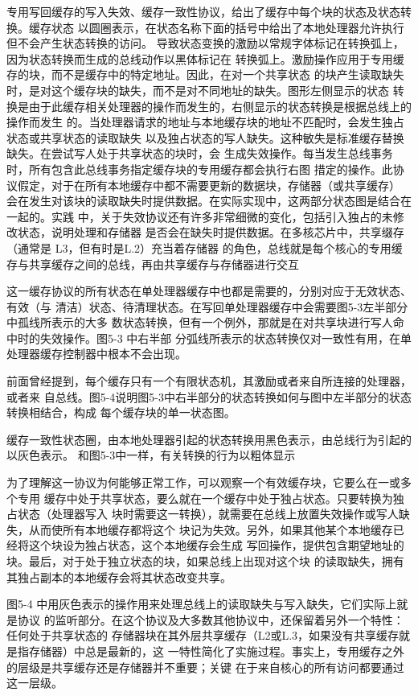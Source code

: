 专用写回缓存的写入失效、缓存一致性协议，给出了缓存中每个块的状态及状态转换。缓存状态
以圆圈表示，在状态名称下面的括号中给出了本地处理器允许执行但不会产生状态转换的访问。
导致状态变换的激励以常规字体标记在转换弧上，因为状态转换而生成的总线动作以黑体标记在
转换弧上。激励操作应用于专用缓存的块，而不是缓存中的特定地址。因此，在对一个共享状态
的块产生读取缺失时，是对这个缓存块的缺失，而不是对不同地址的缺失。图形左侧显示的状态
转换是由于此缓存相关处理器的操作而发生的，右侧显示的状态转换是根据总线上的操作而发生
的。当处理器请求的地址与本地缓存块的地址不匹配时，会发生独占状态或共享状态的读取缺失
以及独占状态的写人缺失。这种敏失是标准缓存替换缺失。在尝试写人处于共享状态的块时，会
生成失效操作。每当发生总线事务时，所有包含此总线事务指定缓存块的专用缓存都会执行右图
措定的操作。此协议假定，对于在所有本地缓存中都不需要更新的数据块，存储器（或共享缓存）
会在发生对该块的读取缺失时提供数据。在实际实现中，这两部分状态图是结合在一起的。实践
中，关于失效协议还有许多非常细微的变化，包括引入独占的未修改状态，说明处理和存储器
是否会在缺失时提供数据。在多核芯片中，共享缀存（通常是 L3，但有时是L.2）充当着存储器
的角色，总线就是每个核心的专用缓存与共享缓存之间的总线，再由共享缓存与存储器进行交互

这一缓存协议的所有状态在单处理器缓存中也都是需要的，分别对应于无效状态、有效（与
清洁）状态、待清理状态。在写回单处理器缓存中会需要图5-3左半部分中孤线所表示的大多
数状态转换，但有一个例外，那就是在对共享块进行写人命中时的失效操作。图5-3 中右半部
分弧线所表示的状态转换仅对一致性有用，在单处理器缓存控制器中根本不会出现。

前面曾经提到，每个缓存只有一个有限状态机，其激励或者来自所连接的处理器，或者来
自总线。图5-4说明图5-3中右半部分的状态转换如何与图中左半部分的状态转换相结合，构成
每个缓存块的单一状态图。

缓存一致性状态圈，由本地处理器引起的状态转换用黑色表示，由总线行为引起的以灰色表示。
和图5-3中一样，有关转换的行为以粗体显示

为了理解这一协议为何能够正常工作，可以观察一个有效缓存块，它要么在一或多个专用
缓存中处于共享状态，要么就在一个缓存中处于独占状态。只要转换为独占状态（处理器写入
块时需要这一转换），就需要在总线上放置失效操作或写人缺失，从而使所有本地缓存都将这个
块记为失效。另外，如果其他某个本地缓存已经将这个块设为独占状态，这个本地缓存会生成
写回操作，提供包含期望地址的块。最后，对于处于独立状态的块，如果总线上出现对这个块
的读取缺失，拥有其独占副本的本地缓存会将其状态改变共享。

图5-4 中用灰色表示的操作用来处理总线上的读取缺失与写入缺失，它们实际上就是协议
的监听部分。在这个协议及大多数其他协议中，还保留着另外一个特性：任何处于共享状态的
存储器块在其外层共享缓存（L2或L.3，如果没有共享缓存就是指存储器）中总是最新的，这
一特性简化了实施过程。事实上，专用缓存之外的层级是共享缓存还是存储器并不重要；关键
在于来自核心的所有访问都要通过这一层级。

